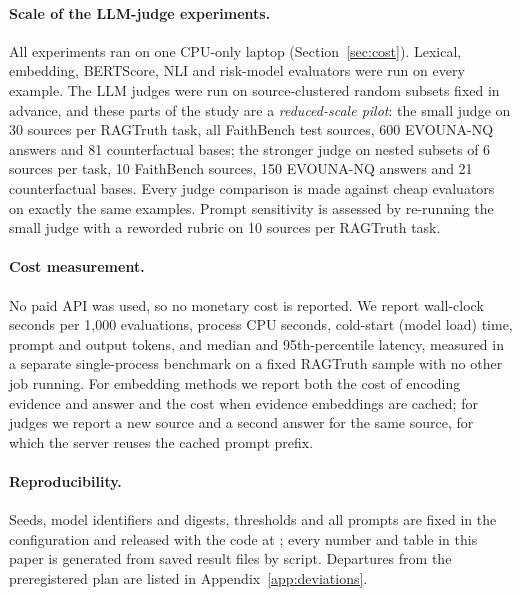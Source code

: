 \paragraph{Scale of the LLM-judge experiments.}
All experiments ran on one CPU-only laptop (Section~\ref{sec:cost}). Lexical, embedding, BERTScore, NLI and risk-model evaluators were run on every example. The LLM judges were run on source-clustered random subsets fixed in advance, and these parts of the study are a \emph{reduced-scale pilot}: the small judge on 30 sources per RAGTruth task, all FaithBench test sources, 600 EVOUNA-NQ answers and 81 counterfactual bases; the stronger judge on nested subsets of 6 sources per task, 10 FaithBench sources, 150 EVOUNA-NQ answers and 21 counterfactual bases. Every judge comparison is made against cheap evaluators on exactly the same examples. Prompt sensitivity is assessed by re-running the small judge with a reworded rubric on 10 sources per RAGTruth task.

\paragraph{Cost measurement.}
No paid API was used, so no monetary cost is reported. We report wall-clock seconds per 1{,}000 evaluations, process CPU seconds, cold-start (model load) time, prompt and output tokens, and median and 95th-percentile latency, measured in a separate single-process benchmark on a fixed RAGTruth sample with no other job running. For embedding methods we report both the cost of encoding evidence and answer and the cost when evidence embeddings are cached; for judges we report a new source and a second answer for the same source, for which the server reuses the cached prompt prefix.

\paragraph{Reproducibility.}
Seeds, model identifiers and digests, thresholds and all prompts are fixed in the configuration and released with the code at \CodeURL; every number and table in this paper is generated from saved result files by script. Departures from the preregistered plan are listed in Appendix~\ref{app:deviations}.
